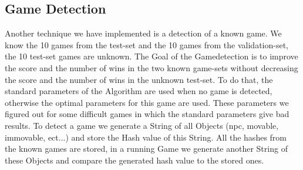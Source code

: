 \subsection{Game Detection} 
  
Another technique we have implemented is a detection of a known game. We know the 10 games from the test-set and the 10 games from the validation-set, the 10 test-set games are unknown. The Goal of the Gamedetection is to improve the score and the number of wins in the two known game-sets without decreasing the score and the number of wins in the unknown test-set. To do that, the standard parameters of the Algorithm are used when no game is detected, otherwise the optimal parameters for this game are used. These parameters we figured out for some difficult games in which the standard parameters give bad results. To detect a game we generate a String of all Objects (npc, movable, immovable, ect...) and store the Hash value of this String. All the hashes from the known games are stored, in a running Game we generate another String of these Objects and compare the generated hash value to the stored ones. 
